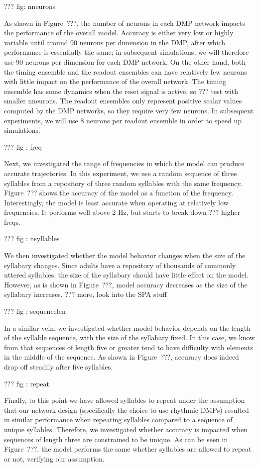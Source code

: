 ??? fig: nneurons

As shown in Figure~???,
the number of neurons in each DMP network
impacts the performance
of the overall model.
Accuracy is either very low or
highly variable until around
90 neurons per dimension
in the DMP, after which
performance is essentially the same;
in subsequent simulations,
we will therefore
use 90 neurons per dimension
for each DMP network.
On the other hand,
both the timing ensemble
and the readout ensembles
can have relatively few neurons
with little impact on
the performance of the overall network.
The timing ensemble
has some dynamics when the reset signal is active,
so ??? test with smaller nneurons.
The readout ensembles
only represent positive scalar values
computed by the DMP networks,
so they require very few neurons.
In subsequent experiments,
we will use 8 neurons per readout ensemble
in order to speed up simulations.

??? fig : freq

Next, we investigated the
range of frequencies in which the model
can produce accurate trajectories.
In this experiment, we use a random sequence
of three syllables from a
repository of three random syllables
with the same frequency.
Figure~??? shows the accuracy
of the model as a function of the frequency.
Interestingly, the model is least accurate
when operating at relatively low frequencies.
It performs well above 2 Hz,
but starts to break down ??? higher freqs.

??? fig : nsyllables

We then investigated whether the model
behavior changes when the size
of the syllabary changes.
Since adults have a repository
of thousands of commonly uttered syllables,
the size of the syllabary should have
little effect on the model.
However, as is shown in Figure~???,
model accuracy decreases
as the size of the syllabary increases.
??? more, look into the SPA stuff

??? fig : sequencelen

In a similar vein,
we investigated whether model behavior
depends on the length of the syllable sequence,
with the size of the syllabary fixed.
In this case, we know from \citet{choo2010}
that sequences of length five or greater
tend to have difficulty with elements
in the middle of the sequence.
As shown in Figure~???,
accuracy does indeed drop off steadily
after five syllables.

??? fig : repeat

Finally, to this point we have
allowed syllables to repeat
under the assumption that our network design
(specifically the choice to use rhythmic DMPs)
resulted in similar performance when
repeating syllables compared to
a sequence of unique syllables.
Therefore, we investigated whether
accuracy is impacted when
sequences of length three
are constrained to be unique.
As can be seen in Figure~???,
the model performs the same
whether syllables are allowed to repeat or not,
verifying our assumption.

